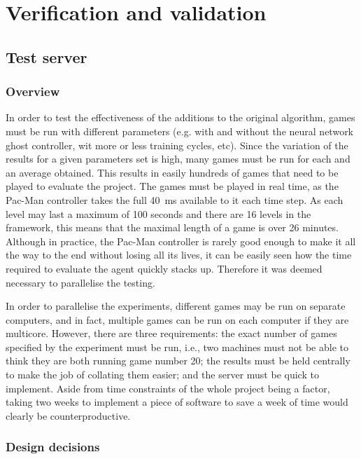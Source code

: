 \chapter{Verification and validation}
\label{ch:verification}

\section{Test server}

\subsection{Overview}

In order to test the effectiveness of the additions to the original algorithm, games must be run with different parameters (e.g. with and without the neural network ghost controller, wit more or less training cycles, etc).  Since the variation of the results for a given parameters set is high, many games must be run for each and an average obtained.  This results in easily hundreds of games that need to be played to evaluate the project.  The games must be played in real time, as the Pac-Man controller takes the full 40~ms available to it each time step.  As each level may last a maximum of 100 seconds and there are 16 levels in the framework, this means that the maximal length of a game is over 26 minutes.  Although in practice, the Pac-Man controller is rarely good enough to make it all the way to the end without losing all its lives, it can be easily seen how the time required to evaluate the agent quickly stacks up.  Therefore it was deemed necessary to parallelise the testing.

In order to parallelise the experiments, different games may be run on separate computers, and in fact, multiple games can be run on each computer if they are multicore.  However, there are three requirements: the exact number of games specified by the experiment must be run, i.e., two machines must not be able to think they are both running game number 20; the results must be held centrally to make the job of collating them easier; and the server must be quick to implement.  Aside from time constraints of the whole project being a factor, taking two weeks to implement a piece of software to save a week of time would clearly be counterproductive.

\subsection{Design decisions}

